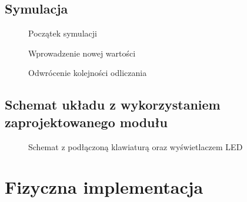 \documentclass[a4paper,12pt]{extarticle}  %
\begin{document}
\subsection{Symulacja}
\begin{figure}[H]
   \centering
   \caption{Początek symulacji}
\end{figure}
\begin{figure}[H]
	\centering
	\caption{Wprowadzenie nowej wartości}
 \end{figure}
 \begin{figure}[H]
	\centering
	\caption{Odwrócenie kolejności odliczania}
 \end{figure}
 \subsection{Schemat układu z wykorzystaniem zaprojektowanego modułu}
 \begin{figure}[H]
	 \centering
	 \caption{Schemat z podłączoną klawiaturą oraz wyświetlaczem LED}
  \end{figure}
\section{Fizyczna implementacja}
\end{document}
